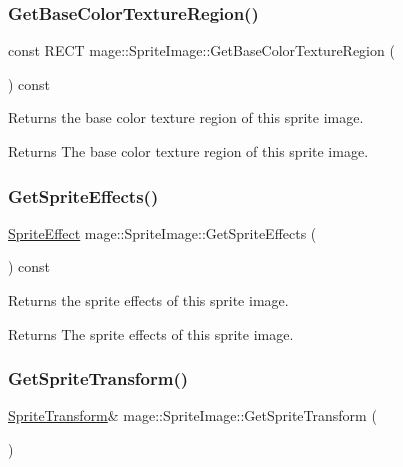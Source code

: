 \subsubsection{\texorpdfstring{Get\+Base\+Color\+Texture\+Region()}{GetBaseColorTextureRegion()}}
{\footnotesize\ttfamily const R\+E\+CT mage\+::\+Sprite\+Image\+::\+Get\+Base\+Color\+Texture\+Region (\begin{DoxyParamCaption}{ }\end{DoxyParamCaption}) const\hspace{0.3cm}{\ttfamily [noexcept]}}

Returns the base color texture region of this sprite image.

\begin{DoxyReturn}{Returns}
The base color texture region of this sprite image. 
\end{DoxyReturn}
\hypertarget{classmage_1_1_sprite_image_a6cfc44918ef3076983e6e1f03de612c8}{}\label{classmage_1_1_sprite_image_a6cfc44918ef3076983e6e1f03de612c8} 
\subsubsection{\texorpdfstring{Get\+Sprite\+Effects()}{GetSpriteEffects()}}
{\footnotesize\ttfamily \hyperlink{namespacemage_ad62ebdf0e7aae0caf1535a4ea3f056ea}{Sprite\+Effect} mage\+::\+Sprite\+Image\+::\+Get\+Sprite\+Effects (\begin{DoxyParamCaption}{ }\end{DoxyParamCaption}) const\hspace{0.3cm}{\ttfamily [noexcept]}}

Returns the sprite effects of this sprite image.

\begin{DoxyReturn}{Returns}
The sprite effects of this sprite image. 
\end{DoxyReturn}
\hypertarget{classmage_1_1_sprite_image_a6293955aa7912f8bf846407ee5d0cfa2}{}\label{classmage_1_1_sprite_image_a6293955aa7912f8bf846407ee5d0cfa2} 
\subsubsection{\texorpdfstring{Get\+Sprite\+Transform()}{GetSpriteTransform()}\hspace{0.1cm}{\footnotesize\ttfamily [1/2]}}
{\footnotesize\ttfamily \hyperlink{classmage_1_1_sprite_transform}{Sprite\+Transform}\& mage\+::\+Sprite\+Image\+::\+Get\+Sprite\+Transform (\begin{DoxyParamCaption}{ }\end{DoxyParamCaption})\hspace{0.3cm}{\ttfamily [noexcept]}}

